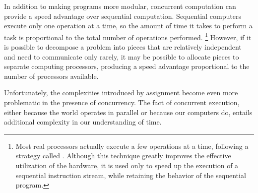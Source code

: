 In addition to making programs more modular, concurrent computation can provide a speed advantage over sequential computation.
Sequential computers execute only one operation at a time, so the amount of time it takes to perform a task is proportional to the total number of operations performed.%
\footnote{
	Most real processors actually execute a few operations at a time, following a strategy called .
	Although this technique greatly improves the effective utilization of the hardware, it is used only to speed up the execution of a sequential instruction stream, while retaining the behavior of the sequential program.
}
However, if it is possible to decompose a problem into pieces that are relatively independent and need to communicate only rarely, it may be possible to allocate pieces to separate computing processors, producing a speed advantage proportional to the number of processors available.

Unfortunately, the complexities introduced by assignment become even more problematic in the presence of concurrency.
The fact of concurrent execution, either because the world operates in parallel or because our computers do, entails additional complexity in our understanding of time.



